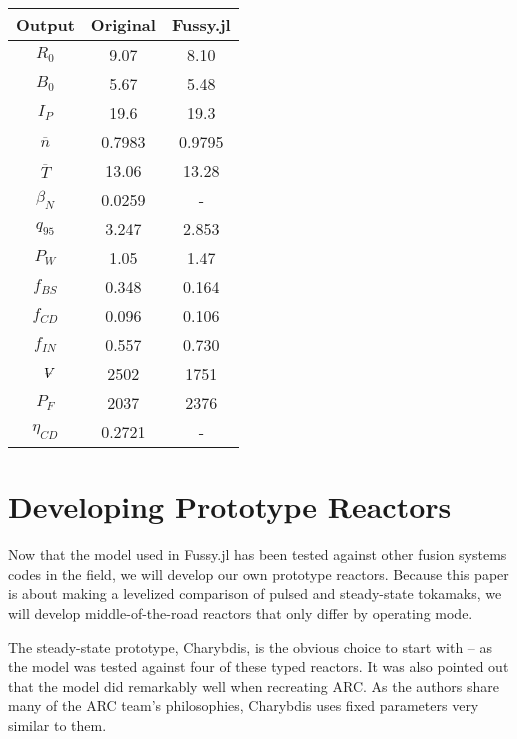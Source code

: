 \begin{table}[h!]
\begin{subtable}[t]{0.5\textwidth}
\begin{tabular}{ c|c|c }
Output           & Original         & Fussy.jl        \\
\hline
$R_{0}$          & 9.07            & 8.10             \\
$B_{0}$          & 5.67            & 5.48            \\
$I_{P}$          & 19.6             & 19.3           \\
$\overline n$    & 0.7983           & 0.9795          \\
$\overline T$    & 13.06            & 13.28           \\
$\beta_{N}$       & 0.0259           & -          \\
$q_{95}$         & 3.247            & 2.853           \\
$P_{W}$          & 1.05             & 1.47           \\
$f_{BS}$         & 0.348            & 0.164          \\
$f_{CD}$         & 0.096            & 0.106          \\
$f_{IN}$         & 0.557            & 0.730          \\
$\volume$         & 2502           & 1751          \\
$P_{F}$          & 2037           & 2376          \\
$\eta_{CD}$      & 0.2721           & -     

\end{tabular}
\end{subtable}
\hfill
\hfill
\end{table}

\section{Developing Prototype Reactors}

Now that the model used in Fussy.jl has been tested against other fusion systems codes in the field, we will develop our own prototype reactors. Because this paper is about making a levelized comparison of pulsed and steady-state tokamaks, we will develop middle-of-the-road reactors that only differ by operating mode. 

The steady-state prototype, Charybdis, is the obvious choice to start with -- as the model was tested against four of these typed reactors. It was also pointed out that the model did remarkably well when recreating ARC. As the authors share many of the ARC team's philosophies, Charybdis uses fixed parameters very similar to them.

